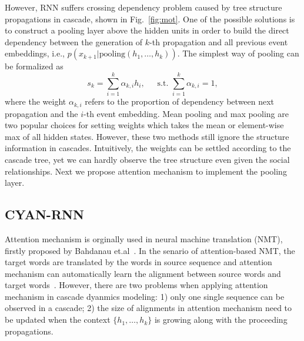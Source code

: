 However, RNN suffers crossing dependency problem caused by tree structure
propagations in cascade, shown in Fig.~\ref{fig:mot}. One of the possible
solutions is to construct a pooling layer above the hidden
units in order to build the direct dependency between the generation of $k$-th
propagation and all previous event embeddings, i.e.,
$p(x_{k+1} | \text{pooling}(h_1,\ldots,h_k))$. The simplest way of pooling can
be formalized as
\begin{equation}
\label{eq:pooling_frame}
s_k=\sum_{i=1}^k \alpha_{k,i} h_i \text{,~~~~~s.t.~} \sum_{i=1}^k
\alpha_{k,i}=1,
\end{equation}
where the weight $\alpha_{k,i}$ refers to the proportion of dependency between
next propagation and the $i$-th event embedding. Mean pooling and max pooling
are two popular choices for setting weights which takes the mean or element-wise
max of all hidden states. However, these two methods still ignore the structure
information in cascades.
Intuitively, the weights can be settled according to the cascade tree, yet we
can hardly observe the tree structure even given the social relationships. Next
we propose attention mechanism to implement the pooling layer. 

\subsection{CYAN-RNN}
Attention mechanism is orginally used in neural machine translation (NMT),
firstly proposed by Bahdanau et.al~\cite{bahdanau2014neural}. In the
senario of attention-based NMT, the target words are translated by the words in
source sequence and attention mechanism can automatically learn the alignment
between source words and target words~\cite{}.
However, there are two
problems when applying attention mechanism in cascade dyanmics modeling: 1)
only one single sequence can be observed in a cascade; 2) the size of alignments
in attention mechanism need to be updated when the context $\{h_1,\ldots,h_k\}$
is growing along with the proceeding propagations.

